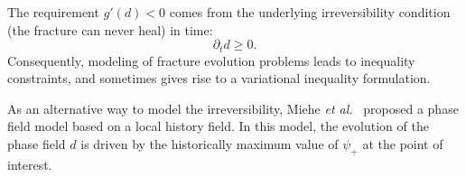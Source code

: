 
\begin{remark}\label{Rem:irreversibility}
The requirement $g'(d)<0$ comes from the underlying irreversibility condition (the fracture can never heal) in time:
\begin{equation}\label{Eq:irreversibility}
    \partial_t d\geq 0.
\end{equation}
Consequently, modeling of fracture evolution problems leads to {inequality constraints, and sometimes gives rise to a variational inequality formulation}.

As an alternative way to {model} the irreversibility, Miehe \emph{et al.}~\cite{Miehe20102765} proposed a phase field model based on a local history field. In this model, the evolution of the phase field $d$ is driven by the historically maximum value of $\psi_+$ at the point of interest.
\end{remark}

